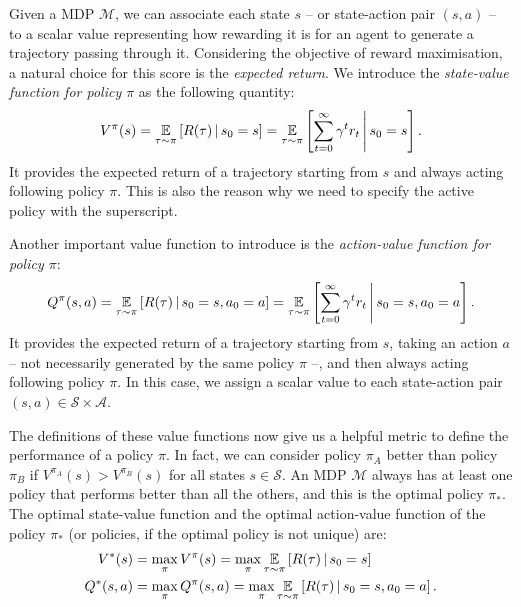 Given a \acl{MDP} $\mathcal{M}$, we can associate each state $s$ -- or state-action pair $(s, a)$ -- to a scalar value representing how rewarding it is for an agent to generate a trajectory passing through it.
Considering the objective of reward maximisation, a natural choice for this score is the \emph{expected return}.
We introduce the \emph{state-value function for policy $\pi$} as the following quantity:
%
\begin{equation}
    \label{equation:state_value_function}
    V^\pi(s) 
    = \operatorname*{\mathbb{E}}_{\tau \sim \pi} \left[ R(\tau) \operatorname{\mid} s_0 = s \right]
    = \operatorname*{\mathbb{E}}_{\tau \sim \pi} \left[ \sum_{t=0}^\infty \gamma^t r_t \,\middle\vert\, s_0 = s \right] .
\end{equation}
%
It provides the expected return of a trajectory starting from $s$ and always acting following policy $\pi$.
This is also the reason why we need to specify the active policy with the superscript.

Another important value function to introduce is the \emph{action-value function for policy $\pi$}:
%
\begin{equation}
    \label{equation:action_value_function}
    Q^\pi(s, a) 
    = \operatorname*{\mathbb{E}}_{\tau \sim \pi} \left[ R(\tau) \operatorname{\mid} s_0 = s, a_0 = a \right]
    = \operatorname*{\mathbb{E}}_{\tau \sim \pi} \left[ \sum_{t=0}^\infty \gamma^t r_t \,\middle\vert\, s_0 = s, a_0 = a \right] .
\end{equation}
%
It provides the expected return of a trajectory starting from $s$, taking an action $a$ -- not necessarily generated by the same policy $\pi$ --, and then always acting following policy $\pi$.
In this case, we assign a scalar value to each state-action pair $(s, a) \in \mathcal{S} \times \mathcal{A}$.

The definitions of these value functions now give us a helpful metric to define the performance of a policy $\pi$.
In fact, we can consider policy $\pi_A$ better than policy $\pi_B$ if $V^{\pi_A}(s) > V^{\pi_B}(s)$ for all states $s \in \mathcal{S}$.
An \ac{MDP} $\mathcal{M}$ always has at least one policy that performs better than all the others, and this is the optimal policy $\pi_*$.
The optimal state-value function and the optimal action-value function of the policy $\pi_*$ (or policies, if the optimal policy is not unique) are:
%
\begin{align*}
    V^*(s) 
    &= \max_\pi V^\pi(s)
    = \max_\pi \operatorname*{\mathbb{E}}_{\tau \sim \pi} \left[ R(\tau) \operatorname{\mid} s_0 = s \right] \\
    Q^*(s, a)
    &= \max_\pi Q^\pi(s, a)
    = \max_\pi \operatorname*{\mathbb{E}}_{\tau \sim \pi} \left[ R(\tau) \operatorname{\mid} s_0 = s, a_0 = a \right] .
\end{align*}

